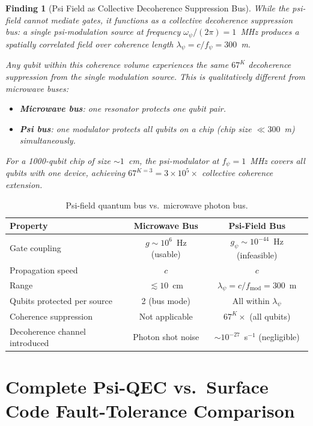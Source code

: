 \documentclass[11pt]{article}
\newtheorem{finding}[theorem]{Finding}
\theoremstyle{definition}
\theoremstyle{remark}
\begin{document}
\begin{finding}[Psi Field as Collective Decoherence Suppression Bus]
\label{finding:psi-coherence-bus}
While the psi-field cannot mediate gates, it functions as a
\emph{collective decoherence suppression bus}: a single psi-modulation
source at frequency $\omega_\psi/(2\pi) = 1$~MHz produces a spatially
correlated field over coherence length $\lambda_\psi = c/f_\psi = 300$~m.

Any qubit within this coherence volume experiences the same
$67^K$ decoherence suppression from the \emph{single} modulation source.
This is qualitatively different from microwave buses:
\begin{itemize}
  \item \textbf{Microwave bus}: one resonator protects one qubit pair.
  \item \textbf{Psi bus}: one modulator protects \emph{all} qubits on
    a chip (chip size $\ll 300$~m) simultaneously.
\end{itemize}
For a 1000-qubit chip of size $\sim1$~cm, the psi-modulator at $f_\psi =
1$~MHz covers all qubits with one device, achieving $67^{K=3} = 3\times10^5\times$
collective coherence extension.
\end{finding}

\begin{table}[h]
\centering
\caption{Psi-field quantum bus vs.\ microwave photon bus.}
\label{tab:bus-comparison}
\begin{tabular}{@{}lcc@{}}
\toprule
Property & Microwave Bus & Psi-Field Bus \\
\midrule
Gate coupling & $g\sim10^6$~Hz (usable) & $g_\psi\sim10^{-44}$~Hz (infeasible) \\
Propagation speed & $c$ & $c$ \\
Range & $\lesssim10$~cm & $\lambda_\psi = c/f_{\mathrm{mod}} = 300$~m \\
Qubits protected per source & 2 (bus mode) & All within $\lambda_\psi$ \\
Coherence suppression & Not applicable & $67^K\times$ (all qubits) \\
Decoherence channel introduced & Photon shot noise & $\sim10^{-27}$~s$^{-1}$ (negligible) \\
\bottomrule
\end{tabular}
\end{table}

\section{Complete Psi-QEC vs.\ Surface Code Fault-Tolerance Comparison}
\label{sec:ft-comparison}
\end{document}
